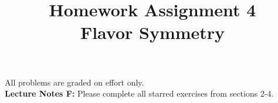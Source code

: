 \documentclass[12pt]{article}
\begin{document}
\date{\vspace{-5ex}}

\title{Homework Assignment 4 \\ Flavor Symmetry}

\maketitle

\noindent
All problems are graded on effort only.\\

\noindent
{\bf Lecture Notes F:} Please complete all starred exercises from
sections 2-4.\\
\end{document}

